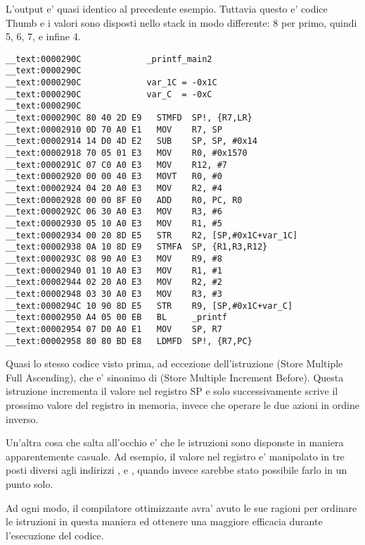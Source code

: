 L'output e' quasi identico al precedente esempio. Tuttavia questo e' codice Thumb e i valori sono disposti nello stack in modo differente:
8 per primo, quindi 5, 6, 7, e infine 4.

\myparagraph{\OptimizingXcodeIV: \ARMMode}

\begin{lstlisting}
__text:0000290C             _printf_main2
__text:0000290C
__text:0000290C             var_1C = -0x1C
__text:0000290C             var_C  = -0xC
__text:0000290C
__text:0000290C 80 40 2D E9   STMFD  SP!, {R7,LR}
__text:00002910 0D 70 A0 E1   MOV    R7, SP
__text:00002914 14 D0 4D E2   SUB    SP, SP, #0x14
__text:00002918 70 05 01 E3   MOV    R0, #0x1570
__text:0000291C 07 C0 A0 E3   MOV    R12, #7
__text:00002920 00 00 40 E3   MOVT   R0, #0
__text:00002924 04 20 A0 E3   MOV    R2, #4
__text:00002928 00 00 8F E0   ADD    R0, PC, R0
__text:0000292C 06 30 A0 E3   MOV    R3, #6
__text:00002930 05 10 A0 E3   MOV    R1, #5
__text:00002934 00 20 8D E5   STR    R2, [SP,#0x1C+var_1C]
__text:00002938 0A 10 8D E9   STMFA  SP, {R1,R3,R12}
__text:0000293C 08 90 A0 E3   MOV    R9, #8
__text:00002940 01 10 A0 E3   MOV    R1, #1
__text:00002944 02 20 A0 E3   MOV    R2, #2
__text:00002948 03 30 A0 E3   MOV    R3, #3
__text:0000294C 10 90 8D E5   STR    R9, [SP,#0x1C+var_C]
__text:00002950 A4 05 00 EB   BL     _printf
__text:00002954 07 D0 A0 E1   MOV    SP, R7
__text:00002958 80 80 BD E8   LDMFD  SP!, {R7,PC}
\end{lstlisting}

Quasi lo stesso codice visto prima, ad eccezione dell'istruzione  (Store Multiple Full Ascending),
che e' sinonimo di  (Store Multiple Increment Before). 
Questa istruzione incrementa il valore nel registro \ac{SP} e solo successivamente scrive il prossimo valore del registro in memoria, invece che operare le due azioni in ordine inverso.

Un'altra cosa che salta all'occhio e' che le istruzioni sono disponste in maniera apparentemente casuale.
Ad esempio, il valore nel registro  e' manipolato in tre posti diversi
agli indirizzi ,  e , quando invece sarebbe stato possibile farlo in un punto solo.

Ad ogni modo, il compilatore ottimizzante avra' avuto le sue ragioni per ordinare le istruzioni in questa maniera ed ottenere una maggiore efficacia durante l'esecuzione del codice.

